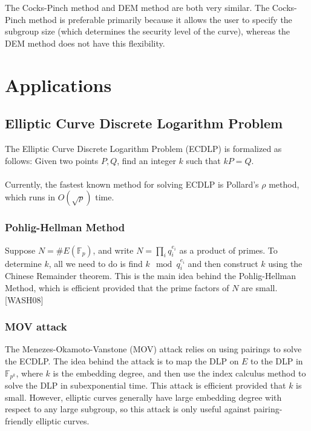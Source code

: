 \documentclass[12pt,twoside]{article}
\begin{document}
The Cocks-Pinch method and DEM method are both very similar. The Cocks-Pinch method is preferable primarily because it allows the user to specify the subgroup size (which determines the security level of the curve), whereas the DEM method does not have this flexibility. 

\section{Applications} 


\subsection{Elliptic Curve Discrete Logarithm Problem}
The Elliptic Curve Discrete Logarithm Problem (ECDLP) is formalized as follows:
Given two points $P,Q$, find an integer $k$ such that $kP = Q$.
\\ \\
\noindent Currently, the fastest known method for solving ECDLP is Pollard's $\rho$ method, which runs in $O(\sqrt p)$ time.

\subsubsection{Pohlig-Hellman Method}
Suppose $N = \#E(\mathbb F_p)$, and write $ N = \prod_{i}q_{i}^{e_{i}}$ as a product of primes. To determine $k$, all we need to do is find $k \mod q^{e_i}_i$ and then construct $k$ using the Chinese Remainder theorem. This is the main idea behind the Pohlig-Hellman Method, which is efficient provided that the prime factors of $N$ are small. [WASH08]




\subsubsection{MOV attack}

The Menezes-Okamoto-Vanstone (MOV) attack relies on using pairings to solve the ECDLP. The idea behind the attack is to map the DLP on $E$ to the DLP in $\mathbb F_{p^k}$, where $k$ is the embedding degree, and then use the index calculus method to solve the DLP in subexponential time. This attack is efficient provided that $k$ is small. However, elliptic curves generally have large embedding degree with respect to any large subgroup, so this attack is only useful against pairing-friendly elliptic curves.
\end{document}
